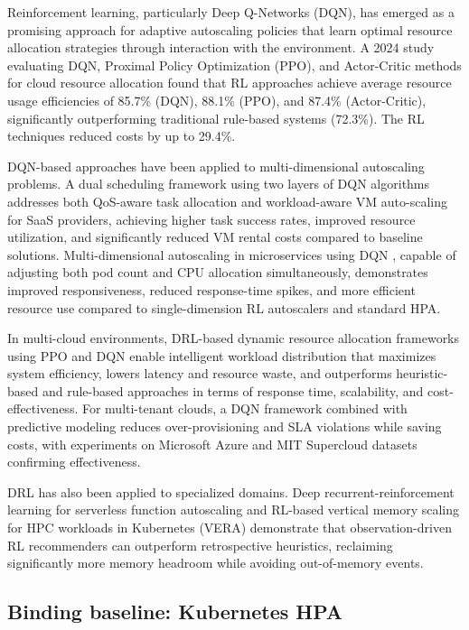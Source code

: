 Reinforcement learning, particularly Deep Q-Networks (DQN), has emerged as a promising approach for adaptive autoscaling policies that learn optimal resource allocation strategies through interaction with the environment. A 2024 study \cite{OptimizingRL24} evaluating DQN, Proximal Policy Optimization (PPO), and Actor-Critic methods for cloud resource allocation found that RL approaches achieve average resource usage efficiencies of 85.7\% (DQN), 88.1\% (PPO), and 87.4\% (Actor-Critic), significantly outperforming traditional rule-based systems (72.3\%). The RL techniques reduced costs by up to 29.4\%.

DQN-based approaches have been applied to multi-dimensional autoscaling problems. A dual scheduling framework using two layers of DQN algorithms \cite{DualSchedulingDQN25} addresses both QoS-aware task allocation and workload-aware VM auto-scaling for SaaS providers, achieving higher task success rates, improved resource utilization, and significantly reduced VM rental costs compared to baseline solutions. Multi-dimensional autoscaling in microservices using DQN \cite{MultiDimDQN25}, capable of adjusting both pod count and CPU allocation simultaneously, demonstrates improved responsiveness, reduced response-time spikes, and more efficient resource use compared to single-dimension RL autoscalers and standard HPA.

In multi-cloud environments, DRL-based dynamic resource allocation frameworks using PPO and DQN \cite{MultiCloudDRL25} enable intelligent workload distribution that maximizes system efficiency, lowers latency and resource waste, and outperforms heuristic-based and rule-based approaches in terms of response time, scalability, and cost-effectiveness. For multi-tenant clouds, a DQN framework combined with predictive modeling \cite{DeepRLMultiTenant25} reduces over-provisioning and SLA violations while saving costs, with experiments on Microsoft Azure and MIT Supercloud datasets confirming effectiveness.

DRL has also been applied to specialized domains. Deep recurrent-reinforcement learning for serverless function autoscaling \cite{DeepRecurrentRL24} and RL-based vertical memory scaling for HPC workloads in Kubernetes (VERA) \cite{VERA26} demonstrate that observation-driven RL recommenders can outperform retrospective heuristics, reclaiming significantly more memory headroom while avoiding out-of-memory events.

\subsection{Binding baseline: Kubernetes HPA}

